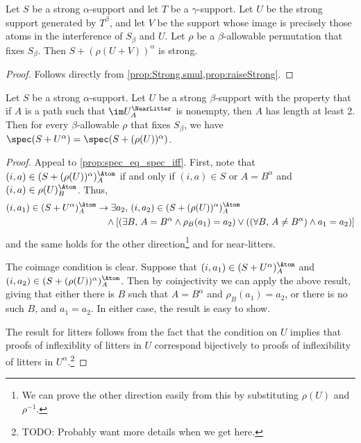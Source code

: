\begin{proposition}
  \label{prop:raiseRaise_strong}
  Let \( S \) be a strong \( \alpha \)-support and let \( T \) be a \( \gamma \)-support.
  Let \( U \) be the strong support generated by \( T^\beta \), and let \( V \) be the support whose image is precisely those atoms in the interference of \( S_\beta \) and \( U \).
  Let \( \rho \) be a \( \beta \)-allowable permutation that fixes \( S_\beta \).
  Then \( S + (\rho(U + V))^\alpha \) is strong.
\end{proposition}
\begin{proof}
  Follows directly from \cref{prop:Strong.smul,prop:raiseStrong}.
\end{proof}
\begin{proposition}
  \label{prop:combineStrong}
  Let \( S \) be a strong \( \alpha \)-support.
  Let \( U \) be a strong \( \beta \)-support with the property that if \( A \) is a path such that \( \im U_A^\NearLitter \) is nonempty, then \( A \) has length at least 2.
  Then for every \( \beta \)-allowable \( \rho \) that fixes \( S_\beta \), we have \( \spec(S + U^\alpha) = \spec(S + (\rho(U))^\alpha) \).
\end{proposition}
\begin{proof}
  Appeal to \cref{prop:spec_eq_spec_iff}.
  First, note that \( (i, a) \in (S + (\rho(U))^\alpha)_A^\Atom \) if and only if \( (i, a) \in S \) or \( A = B^\alpha \) and \( (i, a) \in \rho(U)_B^\Atom \).
  Thus,
  \begin{align*}
    (i, a_1) \in (S + U^\alpha)_A^\Atom &\to \exists a_2,\, (i, a_2) \in (S + (\rho(U))^\alpha)_A^\Atom \\
    &\quad\wedge [(\exists B,\, A = B^\alpha \wedge \rho_B(a_1) = a_2) \vee ((\forall B,\, A \neq B^\alpha) \wedge a_1 = a_2)]
  \end{align*}
  and the same holds for the other direction\footnote{We can prove the other direction easily from this by substituting \( \rho(U) \) and \( \rho^{-1} \).} and for near-litters.

  The coimage condition is clear.
  Suppose that \( (i, a_1) \in (S + U^\alpha)_A^\Atom \) and \( (i, a_2) \in (S + (\rho(U))^\alpha)_A^\Atom \).
  Then by coinjectivity we can apply the above result, giving that either there is \( B \) such that \( A = B^\alpha \) and \( \rho_B(a_1) = a_2 \), or there is no such \( B \), and \( a_1 = a_2 \).
  In either case, the result is easy to show.

  The result for litters follows from the fact that the condition on \( U \) implies that proofs of inflexiblity of litters in \( U \) correspond bijectively to proofs of inflexibility of litters in \( U^\alpha \).\footnote{TODO: Probably want more details when we get here.}
\end{proof}
